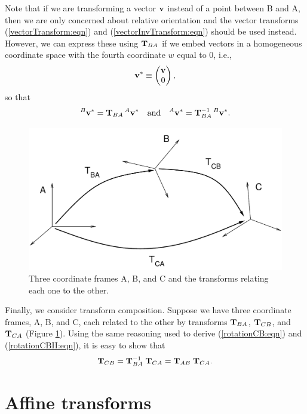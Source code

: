 Note that if we are transforming a vector ${\bf v}$ instead of a point
between B and A, then we are only concerned about relative orientation
and the vector transforms (\ref{vectorTransform:eqn}) and
(\ref{vectorInvTransform:eqn}) should be used instead.
However, we can express these using ${\bf T}_{BA}$ if
we embed vectors in a homogeneous coordinate space 
with the fourth coordinate $w$ equal to 0, i.e.,
%
\begin{equation}
{\bf v}^* \equiv \left(\begin{matrix} {\bf v} \\ 0 \end{matrix}\right),
\end{equation}
%
so that
%
\begin{equation*}
{}^B{\bf v}^* = {\bf T}_{BA} \, {}^A{\bf v}^* \quad \text{and} \quad
{}^A{\bf v}^* = {\bf T}_{BA}^{-1} \, {}^B{\bf v}^*.
\end{equation*}
%

\begin{figure}[t]
\begin{center}
 \includegraphics[width=4.5in]{images/transformABC}
\end{center}
\caption{Three coordinate frames A, B, and C and the transforms
relating each one to the other.}
\label{transformsABC:fig}
\end{figure}

Finally, we consider transform composition. Suppose we have three
coordinate frames, A, B, and C, each related to the other by
transforms ${\bf T}_{BA}$, ${\bf T}_{CB}$, and ${\bf T}_{CA}$ (Figure
\ref{transformsABC:fig}).  Using the same reasoning used to derive
(\ref{rotationCB:eqn}) and (\ref{rotationCBII:eqn}), it is easy to
show that
%
\begin{equation}
{\bf T}_{CB} = {\bf T}_{BA}^{-1} \; {\bf T}_{CA} = {\bf T}_{AB} \; {\bf T}_{CA}.
\end{equation}
%

\section{Affine transforms}
\label{AffineTransforms:sec}

